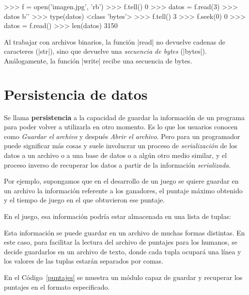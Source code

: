 \begin{codigo-python-sn}
>>> f = open('imagen.jpg', 'rb')
>>> f.tell()
0
>>> datos = f.read(3)
>>> datos
b'\xff{}\xff'
>>> type(datos)
<class 'bytes'>
>>> f.tell()
3
>>> f.seek(0)
0
>>> datos = f.read()
>>> len(datos)
3150
\end{codigo-python-sn}

\begin{atencion}
Al trabajar con archivos binarios, la función |read| no devuelve cadenas de
caracteres (|str|), sino que devuelve una \emph{secuencia de bytes} (|bytes|).
Análogamente, la función |write| recibe una secuencia de bytes.
\end{atencion}

\section{Persistencia de datos}

Se llama {\bf persistencia} a la capacidad de guardar la
información de un programa para poder volver a utilizarla en otro
momento. Es lo que los usuarios conocen como \emph{Guardar el archivo}
y después \emph{Abrir el archivo}. Pero para un programador puede
significar más cosas y suele involucrar un proceso de
\emph{serialización} de los datos a un archivo o a una base de datos o a
algún otro medio similar, y el proceso inverso de recuperar los
datos a partir de la información \emph{serializada}.


Por ejemplo, supongamos que en el desarrollo de un juego se quiere guardar
en un archivo la información referente a los ganadores, el puntaje máximo
obtenido y el tiempo de juego en el que obtuvieron ese puntaje.

En el juego, esa información podría estar almacenada en una lista de
tuplas:
\begin{codigo-python-sn}
\end{codigo-python-sn}

Esta información se puede guardar en un archivo de muchas formas distintas.
En este caso, para facilitar la lectura del archivo de puntajes para los
humanos, se decide guardarlos en un archivo de texto, donde cada tupla
ocupará una línea y los valores de las tuplas estarán separados por
comas.

En el Código~\ref{puntajes} se muestra un módulo capaz de guardar y
recuperar los puntajes en el formato especificado.

